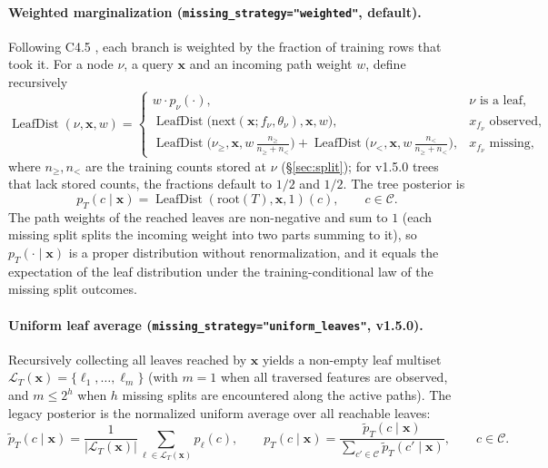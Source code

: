 \documentclass[11pt,a4paper]{article}
\newcommand{\code}[1]{\texttt{#1}}
\DeclareMathOperator{\LeafDist}{LeafDist}
\begin{document}
\paragraph{Weighted marginalization (\code{missing\_strategy="weighted"}, default).}
Following C4.5 \citep{quinlan1993}, each branch is weighted by the fraction of training rows that took it. For a node $\nu$, a query $\mathbf{x}$ and an incoming path weight $w$, define recursively
\begin{equation}
  \LeafDist(\nu, \mathbf{x}, w) =
  \begin{cases}
    w \cdot p_{\nu}(\cdot), & \nu \text{ is a leaf}, \\[2pt]
    \LeafDist\big(\text{next}(\mathbf{x}; f_\nu, \theta_\nu), \mathbf{x}, w\big), & x_{f_\nu} \text{ observed}, \\[2pt]
    \LeafDist\big(\nu_{\ge}, \mathbf{x}, w\,\tfrac{n_{\ge}}{n_{\ge} + n_{<}}\big) + \LeafDist\big(\nu_{<}, \mathbf{x}, w\,\tfrac{n_{<}}{n_{\ge} + n_{<}}\big), & x_{f_\nu} \text{ missing},
  \end{cases}
\end{equation}
where $n_{\ge}, n_{<}$ are the training counts stored at $\nu$ (\S\ref{sec:split}); for v1.5.0 trees that lack stored counts, the fractions default to $1/2$ and $1/2$. The tree posterior is
\begin{equation}
  p_T(c \mid \mathbf{x}) = \LeafDist(\text{root}(T), \mathbf{x}, 1)(c), \qquad c \in \mathcal{C}.
\end{equation}
The path weights of the reached leaves are non-negative and sum to $1$ (each missing split splits the incoming weight into two parts summing to it), so $p_T(\cdot \mid \mathbf{x})$ is a proper distribution without renormalization, and it equals the expectation of the leaf distribution under the training-conditional law of the missing split outcomes.

\paragraph{Uniform leaf average (\code{missing\_strategy="uniform\_leaves"}, v1.5.0).}
Recursively collecting all leaves reached by $\mathbf{x}$ yields a non-empty leaf multiset $\mathcal{L}_T(\mathbf{x}) = \{\ell_1, \dots, \ell_m\}$ (with $m = 1$ when all traversed features are observed, and $m \le 2^{h}$ when $h$ missing splits are encountered along the active paths). The legacy posterior is the normalized uniform average over all reachable leaves:
\begin{equation}
  \tilde{p}_{T}(c \mid \mathbf{x}) = \frac{1}{|\mathcal{L}_{T}(\mathbf{x})|} \sum_{\ell \in \mathcal{L}_{T}(\mathbf{x})} p_{\ell}(c),
  \qquad
  p_T(c \mid \mathbf{x}) = \frac{\tilde{p}_{T}(c \mid \mathbf{x})}{\sum_{c' \in \mathcal{C}} \tilde{p}_{T}(c' \mid \mathbf{x})},
  \qquad c \in \mathcal{C}.
\end{equation}
\end{document}
